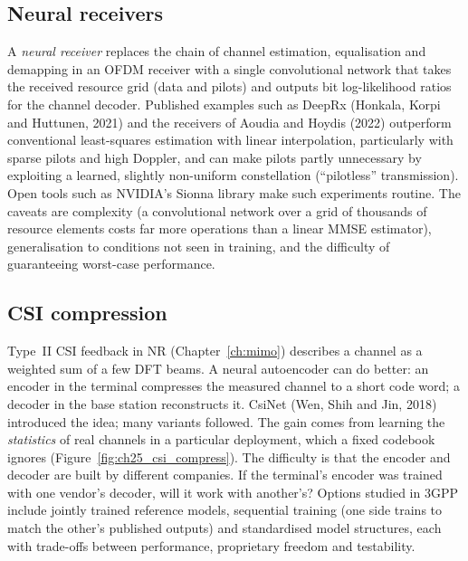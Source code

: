 \subsection{Neural receivers}

A \emph{neural receiver} replaces the chain of channel estimation, equalisation and demapping in an
OFDM receiver with a single convolutional network that takes the received resource grid (data and
pilots) and outputs bit log-likelihood ratios for the channel decoder. Published examples such as
DeepRx (Honkala, Korpi and Huttunen, 2021) and the receivers of Aoudia and Hoydis (2022) outperform
conventional least-squares estimation with linear interpolation, particularly with sparse pilots and
high Doppler, and can make pilots partly unnecessary by exploiting a learned, slightly non-uniform
constellation (``pilotless'' transmission). Open tools such as NVIDIA's Sionna library make such
experiments routine. The caveats are complexity (a convolutional network over a grid of thousands of
resource elements costs far more operations than a linear MMSE estimator), generalisation to
conditions not seen in training, and the difficulty of guaranteeing worst-case performance.

\subsection{CSI compression}

Type~II CSI feedback in NR (Chapter~\ref{ch:mimo}) describes a channel as a weighted sum of a few DFT
beams. A neural autoencoder can do better: an encoder in the terminal compresses the measured
channel to a short code word; a decoder in the base station reconstructs it. CsiNet (Wen, Shih and Jin,
2018) introduced the idea; many variants followed. The gain comes from learning the \emph{statistics}
of real channels in a particular deployment, which a fixed codebook ignores (Figure~\ref{fig:ch25_csi_compress}). The difficulty is that
the encoder and decoder are built by different companies. If the terminal's encoder was trained with
one vendor's decoder, will it work with another's? Options studied in 3GPP include jointly trained
reference models, sequential training (one side trains to match the other's published outputs) and
standardised model structures, each with trade-offs between performance, proprietary freedom and
testability.


